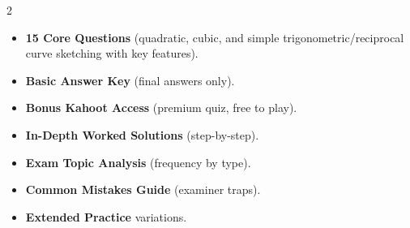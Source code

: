 \documentclass[11pt,a4paper]{article}
\newcommand{\FullReleaseDate}{April 30, 2026}
\begin{document}
\vspace{8pt}

\begin{multicols}{2}
  \begin{tcolorbox}[card, title=\sffamily\bfseries\textcolor{white}{\faHandPointDown\ TODAY (Simplified Version)}, colbacktitle=mainblue, boxed title style={sharp corners, boxrule=0pt}]
    \begin{itemize}[leftmargin=1.2em, itemsep=2pt]
      \item \small \textbf{15 Core Questions} (quadratic, cubic, and simple trigonometric/reciprocal curve sketching with key features).
      \item \small \textbf{Basic Answer Key} (final answers only).
      \item \small \textbf{Bonus Kahoot Access} (premium quiz, free to play).
    \end{itemize}
  \end{tcolorbox}

  \columnbreak

  \begin{tcolorbox}[card, title=\sffamily\bfseries\textcolor{white}{\faRocket\ ON \FullReleaseDate\ (Full Upgrade)}, colbacktitle=mainblue, boxed title style={sharp corners, boxrule=0pt}]
    \begin{itemize}[leftmargin=1.2em, itemsep=2pt]
      \item \small \textbf{In-Depth Worked Solutions} (step-by-step).
      \item \small \textbf{Exam Topic Analysis} (frequency by type).
      \item \small \textbf{Common Mistakes Guide} (examiner traps).
      \item \small \textbf{Extended Practice} variations.
    \end{itemize}
  \end{tcolorbox}
\end{multicols}
\end{document}

